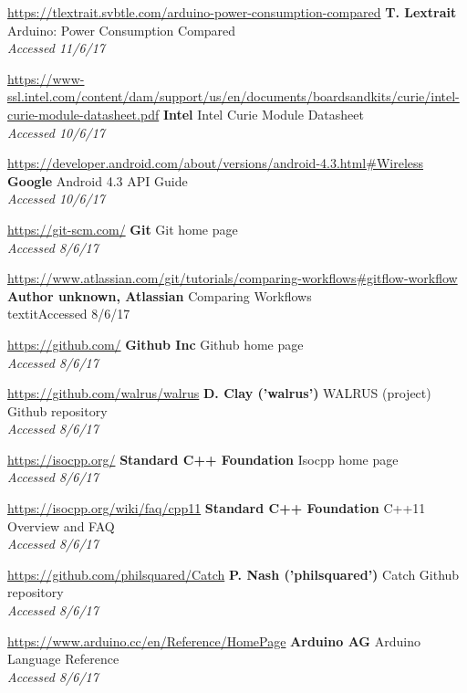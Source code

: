 \documentclass[a4paper]{article}
\begin{document}
\begin{thebibliography}{9}
\url{https://tlextrait.svbtle.com/arduino-power-consumption-compared}
\textbf{T. Lextrait}
Arduino: Power Consumption Compared
\\\textit{Accessed 11/6/17}

\url{https://www-ssl.intel.com/content/dam/support/us/en/documents/boardsandkits/curie/intel-curie-module-datasheet.pdf}
\textbf{Intel}
Intel Curie Module Datasheet
\\\textit{Accessed 10/6/17}

\url{https://developer.android.com/about/versions/android-4.3.html#Wireless}
\textbf{Google}
Android 4.3 API Guide
\\\textit{Accessed 10/6/17}


\url{https://git-scm.com/}
\textbf{Git }
Git home page
\\\textit{Accessed 8/6/17}

\url{https://www.atlassian.com/git/tutorials/comparing-workflows#gitflow-workflow}
\textbf{Author unknown, Atlassian}
Comparing Workflows
\\textit{Accessed 8/6/17}

\url{https://github.com/}
\textbf{Github Inc}
Github home page
\\\textit{Accessed 8/6/17}

\url{https://github.com/walrus/walrus}
\textbf{D. Clay ('walrus')}
WALRUS (project) Github repository
\\\textit{Accessed 8/6/17}

\url{https://isocpp.org/}
\textbf{Standard C++ Foundation}
Isocpp home page
\\\textit{Accessed 8/6/17}

\url{https://isocpp.org/wiki/faq/cpp11}
\textbf{Standard C++ Foundation}
C++11 Overview and FAQ
\\\textit{Accessed 8/6/17}

\url{https://github.com/philsquared/Catch}
\textbf{P. Nash ('philsquared')}
Catch Github repository
\\\textit{Accessed 8/6/17}

\url{https://www.arduino.cc/en/Reference/HomePage}
\textbf{Arduino AG}
Arduino Language Reference
\\\textit{Accessed 8/6/17}


\end{thebibliography}
\end{document}
